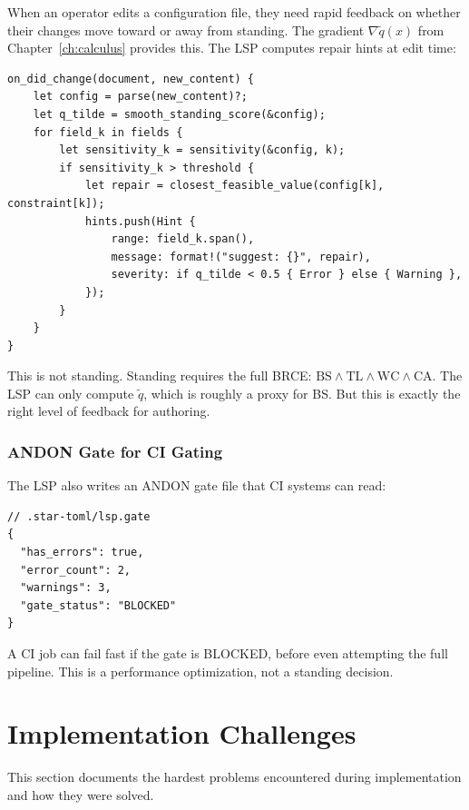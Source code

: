 When an operator edits a configuration file, they need rapid feedback on whether their changes move toward or away from standing. The gradient $\nabla\tilde{q}(x)$ from Chapter~\ref{ch:calculus} provides this. The LSP computes repair hints at edit time:

\begin{lstlisting}[caption={Repair hints derived from the satisfaction score}]
on_did_change(document, new_content) {
    let config = parse(new_content)?;
    let q_tilde = smooth_standing_score(&config);
    for field_k in fields {
        let sensitivity_k = sensitivity(&config, k);
        if sensitivity_k > threshold {
            let repair = closest_feasible_value(config[k], constraint[k]);
            hints.push(Hint {
                range: field_k.span(),
                message: format!("suggest: {}", repair),
                severity: if q_tilde < 0.5 { Error } else { Warning },
            });
        }
    }
}
\end{lstlisting}

This is not standing. Standing requires the full BRCE: $\mathrm{BS} \wedge \mathrm{TL} \wedge \mathrm{WC} \wedge \mathrm{CA}$. The LSP can only compute $\tilde{q}$, which is roughly a proxy for BS. But this is exactly the right level of feedback for authoring.

\subsubsection{ANDON Gate for CI Gating}

The LSP also writes an ANDON gate file that CI systems can read:

\begin{lstlisting}[caption={ANDON gate file written by LSP}]
// .star-toml/lsp.gate
{
  "has_errors": true,
  "error_count": 2,
  "warnings": 3,
  "gate_status": "BLOCKED"
}
\end{lstlisting}

A CI job can fail fast if the gate is BLOCKED, before even attempting the full pipeline. This is a performance optimization, not a standing decision.

\section{Implementation Challenges}

This section documents the hardest problems encountered during implementation and how they were solved.

